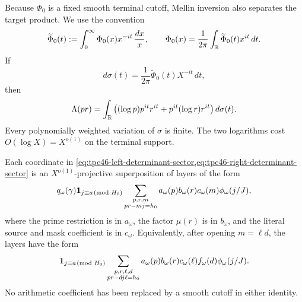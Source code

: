 Because \(\Phi_0\) is a fixed smooth terminal cutoff, Mellin inversion
also separates the target product.  We use the convention
\begin{equation}
 \widetilde\Phi_0(t)
 :=\int_0^\infty\Phi_0(x)x^{-it}\,\frac{dx}{x},
 \qquad
 \Phi_0(x)=\frac1{2\pi}\int_{\mathbb R}
 \widetilde\Phi_0(t)x^{it}\,dt.
 \label{eq:tpc46-Mellin-convention}
\end{equation}
If
\begin{equation}
 d\sigma(t)=\frac1{2\pi}\widetilde\Phi_0(t)X^{-it}\,dt,
 \label{eq:tpc46-Mellin-measure}
\end{equation}
then
\begin{equation}
 \Lambda(pr)
 =\int_{\mathbb R}
 \left((\log p)p^{it}r^{it}
       +p^{it}(\log r)r^{it}\right)d\sigma(t).
 \label{eq:tpc46-target-Mellin-separation}
\end{equation}
Every polynomially weighted variation of \(\sigma\) is finite.  The
two logarithms cost \(O(\log X)=X^{o(1)}\) on the terminal support.

\begin{corollary}
\label{cor:tpc46-product-ready-layers}
Each coordinate in
\cref{eq:tpc46-left-determinant-sector,eq:tpc46-right-determinant-sector}
 is an \(X^{o(1)}\)-projective superposition of layers of the form
\begin{equation}
 q_\omega(\gamma)
 \mathbf 1_{j\equiv a\!\!\pmod{H_0}}
 \sum_{\substack{p,r,m\\pr-mj=h_0}}
 a_\omega(p)b_\omega(r)c_\omega(m)
 \phi_\omega(j/J),
 \label{eq:tpc46-three-coefficient-layer}
\end{equation}
where the prime restriction is in \(a_\omega\), the factor \(\mu(r)\)
is in \(b_\omega\), and the literal source and mask coefficient is in
\(c_\omega\).  Equivalently, after opening \(m=\ell d\), the layers
have the form
\begin{equation}
 \mathbf 1_{j\equiv a\!\!\pmod{H_0}}
 \sum_{\substack{p,r,\ell,d\\pr-dj\ell=h_0}}
 a_\omega(p)b_\omega(r)
 c_\omega(\ell)f_\omega(d)\phi_\omega(j/J).
 \label{eq:tpc46-opened-determinant-layer}
\end{equation}
No arithmetic coefficient has been replaced by a smooth cutoff in
either identity.
\end{corollary}

